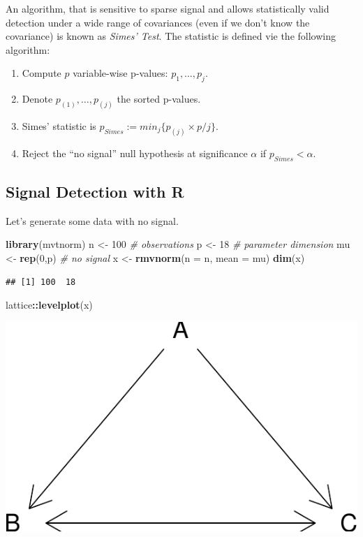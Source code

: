 \documentclass[]{book}
\newenvironment{Shaded}{\begin{snugshade}}{\end{snugshade}}
\newcommand{\CommentTok}[1]{\textcolor[rgb]{0.56,0.35,0.01}{\textit{#1}}}
\newcommand{\DataTypeTok}[1]{\textcolor[rgb]{0.13,0.29,0.53}{#1}}
\newcommand{\DecValTok}[1]{\textcolor[rgb]{0.00,0.00,0.81}{#1}}
\newcommand{\KeywordTok}[1]{\textcolor[rgb]{0.13,0.29,0.53}{\textbf{#1}}}
\newcommand{\NormalTok}[1]{#1}
\newcommand{\OperatorTok}[1]{\textcolor[rgb]{0.81,0.36,0.00}{\textbf{#1}}}
\newcommand{\StringTok}[1]{\textcolor[rgb]{0.31,0.60,0.02}{#1}}
\providecommand{\tightlist}{%
  \setlength{\itemsep}{0pt}\setlength{\parskip}{0pt}}
\theoremstyle{definition}
\theoremstyle{definition}
\theoremstyle{definition}
\theoremstyle{remark}
\begin{document}
An algorithm, that is sensitive to sparse signal and allows statistically valid detection under a wide range of covariances (even if we don't know the covariance) is known as \emph{Simes' Test}.
The statistic is defined vie the following algorithm:

\begin{enumerate}
\def\labelenumi{\arabic{enumi}.}
\tightlist
\item
  Compute \(p\) variable-wise p-values: \(p_1,\dots,p_j\).
\item
  Denote \(p_{(1)},\dots,p_{(j)}\) the sorted p-values.
\item
  Simes' statistic is \(p_{Simes}:=min_j\{p_{(j)} \times p/j\}\).
\item
  Reject the ``no signal'' null hypothesis at significance \(\alpha\) if \(p_{Simes}<\alpha\).
\end{enumerate}

\hypertarget{signal-detection-with-r}{%
\subsection{Signal Detection with R}\label{signal-detection-with-r}}

Let's generate some data with no signal.

\begin{Shaded}
\begin{Highlighting}[]
\KeywordTok{library}\NormalTok{(mvtnorm)}
\NormalTok{n <-}\StringTok{ }\DecValTok{100} \CommentTok{# observations}
\NormalTok{p <-}\StringTok{ }\DecValTok{18} \CommentTok{# parameter dimension}
\NormalTok{mu <-}\StringTok{ }\KeywordTok{rep}\NormalTok{(}\DecValTok{0}\NormalTok{,p) }\CommentTok{# no signal}
\NormalTok{x <-}\StringTok{ }\KeywordTok{rmvnorm}\NormalTok{(}\DataTypeTok{n =}\NormalTok{ n, }\DataTypeTok{mean =}\NormalTok{ mu)}
\KeywordTok{dim}\NormalTok{(x)}
\end{Highlighting}
\end{Shaded}

\begin{verbatim}
## [1] 100  18
\end{verbatim}

\begin{Shaded}
\begin{Highlighting}[]
\NormalTok{lattice}\OperatorTok{::}\KeywordTok{levelplot}\NormalTok{(x)}
\end{Highlighting}
\end{Shaded}

\includegraphics[width=0.5\linewidth]{Rcourse_files/figure-latex/unnamed-chunk-222-1}
\end{document}
